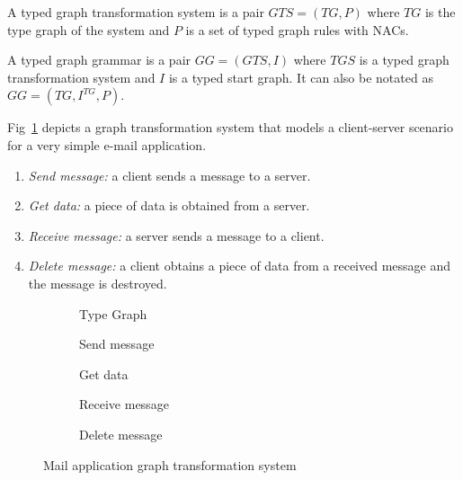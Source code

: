\begin{definition} A typed graph transformation system is a pair $GTS = \left(TG,P\right)$ where $TG$ is the type graph of the system and $P$ is a set of typed graph rules with NACs.

  A typed graph grammar is a pair $GG = \left(GTS,I\right)$ where $TGS$ is a typed graph transformation system and $I$ is a typed start graph. It can also be notated as $GG = \left(TG, I^{TG},P \right)$.

\end{definition}

\begin{example} Fig~\ref{fig:gts:mail} depicts a graph transformation system that models a client-server scenario for a very simple e-mail application. 

  \begin{enumerate}[label=(\alph*),start=2]
    \item \emph{Send message:} a client sends a message to a server.
  \item \emph{Get data:} a piece of data is obtained from a server.
  \item \emph{Receive message:} a server sends a message to a client.
  \item \emph{Delete message:} a client obtains a piece of data from a received message and the message is destroyed.
\end{enumerate}

\begin{figure}[!ht]
  \centering
  \begin{subfigure}[t]{.5\textwidth}
    \centerline{}
    \caption{Type Graph}
  \end{subfigure}
  \begin{subfigure}[t]{.5\textwidth}
    \centerline{}
    \caption{Send message}
  \end{subfigure}%
  \begin{subfigure}[t]{.5\textwidth}
    \centerline{}
    \caption{Get data}
  \end{subfigure}
  \begin{subfigure}[t]{.5\textwidth}
    \centerline{}
    \caption{Receive message}
  \end{subfigure}%
  \begin{subfigure}[t]{.5\textwidth}
    \centerline{}
    \caption{Delete message}
  \end{subfigure}
  \caption{Mail application graph transformation system}\label{fig:gts:mail}
\end{figure}
\end{example}

